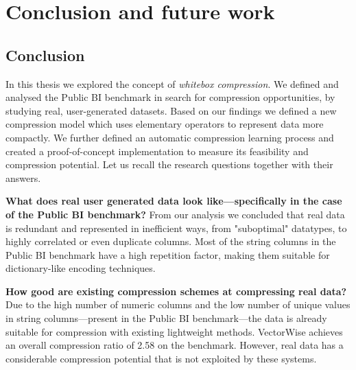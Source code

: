 
\chapter{Conclusion and future work} %





% 

\section{Conclusion}

In this thesis we explored the concept of \textit{whitebox compression}. We defined and analysed the Public BI benchmark in search for compression opportunities, by studying real, user-generated datasets. Based on our findings we defined a new compression model which uses elementary operators to represent data more compactly. We further defined an automatic compression learning process and created a proof-of-concept implementation to measure its feasibility and compression potential. Let us recall the research questions together with their answers.

\textbf{What does real user generated data look like---specifically in the case of the Public BI benchmark?}
From our analysis we concluded that real data is redundant and represented in inefficient ways, from "suboptimal" datatypes, to highly correlated or even duplicate columns. Most of the string columns in the Public BI benchmark have a high repetition factor, making them suitable for dictionary-like encoding techniques.
\iffalse
\fi

\textbf{How good are existing compression schemes at compressing real data?} Due to the high number of numeric columns and the low number of unique values in string columns---present in the Public BI benchmark---the data is already suitable for compression with existing lightweight methods. VectorWise achieves an overall compression ratio of 2.58 on the benchmark. However, real data has a considerable compression potential that is not exploited by these systems.
\iffalse
\fi

